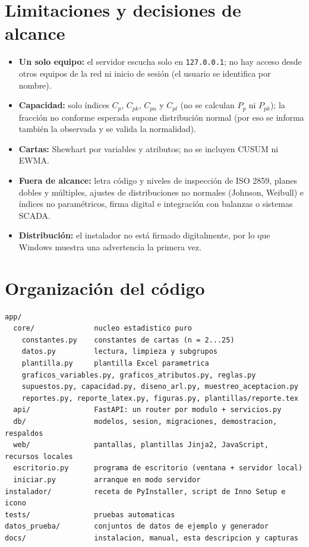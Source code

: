 \documentclass[11pt,a4paper]{article}
\begin{document}
\section{Limitaciones y decisiones de alcance}
\begin{itemize}
\item \textbf{Un solo equipo:} el servidor escucha solo en \texttt{127.0.0.1}; no hay acceso
  desde otros equipos de la red ni inicio de sesión (el usuario se identifica por nombre).
\item \textbf{Capacidad:} solo índices $C_p$, $C_{pk}$, $C_{pu}$ y $C_{pl}$ (no se calculan
  $P_p$ ni $P_{pk}$); la fracción no conforme esperada supone distribución normal (por eso se
  informa también la observada y se valida la normalidad).
\item \textbf{Cartas:} Shewhart por variables y atributos; no se incluyen CUSUM ni EWMA.
\item \textbf{Fuera de alcance:} letra código y niveles de inspección de ISO 2859, planes dobles
  y múltiples, ajustes de distribuciones no normales (Johnson, Weibull) e índices no
  paramétricos, firma digital e integración con balanzas o sistemas SCADA.
\item \textbf{Distribución:} el instalador no está firmado digitalmente, por lo que Windows
  muestra una advertencia la primera vez.
\end{itemize}

\section{Organización del código}

{\small
\begin{verbatim}
app/
  core/              nucleo estadistico puro
    constantes.py    constantes de cartas (n = 2...25)
    datos.py         lectura, limpieza y subgrupos
    plantilla.py     plantilla Excel parametrica
    graficos_variables.py, graficos_atributos.py, reglas.py
    supuestos.py, capacidad.py, diseno_arl.py, muestreo_aceptacion.py
    reportes.py, reporte_latex.py, figuras.py, plantillas/reporte.tex
  api/               FastAPI: un router por modulo + servicios.py
  db/                modelos, sesion, migraciones, demostracion, respaldos
  web/               pantallas, plantillas Jinja2, JavaScript, recursos locales
  escritorio.py      programa de escritorio (ventana + servidor local)
  iniciar.py         arranque en modo servidor
instalador/          receta de PyInstaller, script de Inno Setup e icono
tests/               pruebas automaticas
datos_prueba/        conjuntos de datos de ejemplo y generador
docs/                instalacion, manual, esta descripcion y capturas
\end{verbatim}
}
\end{document}
